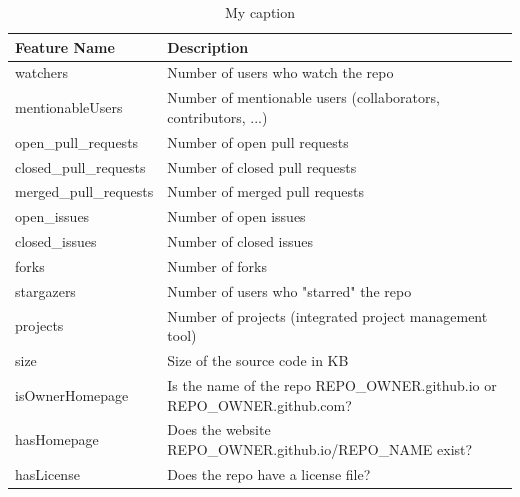 \documentclass{article}
\begin{document}
\begin{table}[]
\centering
\caption{My caption}
\label{features}
\begin{tabularx}{\linewidth}{|l|X|}
\hline
Feature Name           & Description                                                                        \\ \hline
watchers               & Number of users who watch the repo                                                 \\ \hline
mentionableUsers       & Number of mentionable users (collaborators, contributors, ...)                     \\ \hline
open\_pull\_requests   & Number of open pull requests                                                       \\ \hline
closed\_pull\_requests & Number of closed pull requests                                                     \\ \hline
merged\_pull\_requests & Number of merged pull requests                                                     \\ \hline
open\_issues           & Number of open issues                                                              \\ \hline
closed\_issues         & Number of closed issues                                                            \\ \hline
forks                  & Number of forks                                                                    \\ \hline
stargazers             & Number of users who "starred" the repo                                             \\ \hline
projects               & Number of projects (integrated project management tool)                            \\ \hline
size                   & Size of the source code in KB                                                      \\ \hline
isOwnerHomepage        & Is the name of the repo REPO\_OWNER.github.io or REPO\_OWNER.github.com?         \\ \hline
hasHomepage            & Does the website \newline{}REPO\_OWNER.github.io/REPO\_NAME exist?                           \\ \hline
hasLicense             & Does the repo have a license file?                                                 \\ \hline

\end{tabularx}
\end{table}
\end{document}
